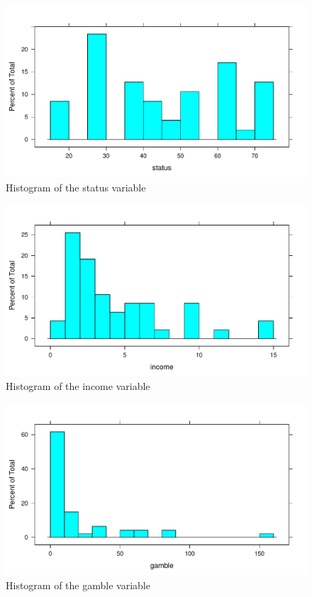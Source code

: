 \documentclass{article}\usepackage[]{graphicx}\usepackage[]{color}
\makeatletter
\def\maxwidth{ %
  \ifdim\Gin@nat@width>\linewidth
    \linewidth
  \else
    \Gin@nat@width
  \fi
}
\newenvironment{knitrout}{}{} %
\makeatother
\begin{document}
\begin{knitrout}
\color{fgcolor}\begin{figure}
\includegraphics[width=\maxwidth]{figure/histograms-1} \caption[Histogram of the status variable]{Histogram of the status variable}\label{fig:histograms1}
\end{figure}

\begin{figure}
\includegraphics[width=\maxwidth]{figure/histograms-2} \caption[Histogram of the income variable]{Histogram of the income variable}\label{fig:histograms2}
\end{figure}

\begin{figure}
\includegraphics[width=\maxwidth]{figure/histograms-3} \caption[Histogram of the gamble variable]{Histogram of the gamble variable}\label{fig:histograms3}
\end{figure}


\end{knitrout}
\end{document}

